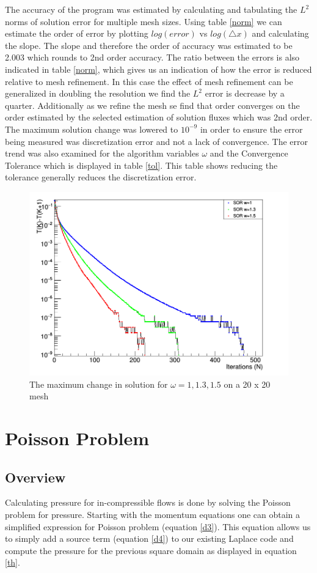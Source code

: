\documentclass[paper=a4, fontsize=11pt, abstract=on]{scrartcl}
\numberwithin{equation}{section}		%
\numberwithin{figure}{section}			%
\numberwithin{table}{section}				%
\begin{document}
The accuracy of the program was estimated by calculating and tabulating the $L^2$ norms of solution error for multiple mesh sizes. Using table \ref{norm} we can estimate the order of error by plotting $log(error)$ vs $log(\triangle x)$ and calculating the slope. The slope and therefore the order of accuracy was estimated to be 2.003 which rounds to 2nd order accuracy. The ratio between the errors is also indicated in table \ref{norm}, which gives us an indication of how the error is reduced relative to mesh refinement. In this case the effect of mesh refinement can be generalized in doubling the resolution we find the $L^2$ error is decrease by a quarter. Additionally as we refine the mesh se find that order converges on the order estimated by the selected estimation of solution fluxes which was 2nd order. The maximum solution change was lowered to $10^{-9}$ in order to ensure the error being measured was discretization error and not a lack of convergence. The error trend was also examined for the algorithm variables $\omega$ and the Convergence Tolerance which is displayed in table \ref{tol}. This table shows reducing the tolerance generally reduces the discretization error. 
\begin{figure}[H]
\centering
\includegraphics[width=0.75\linewidth]{q4}
\caption{The maximum change in solution for $\omega = 1, 1.3, 1.5$ on a 20 x 20 mesh}
\label{q4}
\end{figure}
 




\section{Poisson Problem}
\subsection{Overview}
Calculating pressure for in-compressible flows is done by solving the Poisson problem for pressure. Starting with the momentum equations one can obtain a simplified expression for Poisson problem (equation \ref{d3}). This equation allows us to simply add a source term (equation \ref{d4}) to our existing Laplace code and compute the pressure for the previous square domain as displayed in equation \ref{th}.
\end{document}
